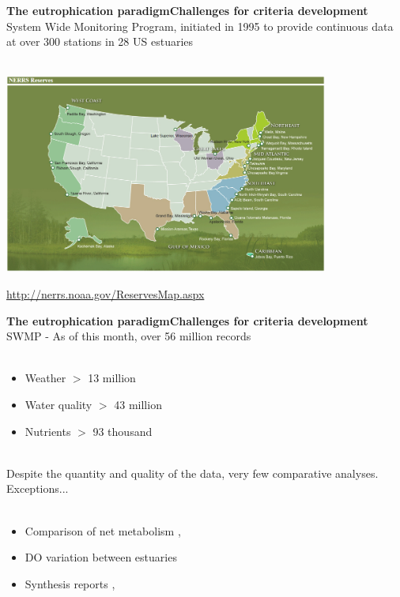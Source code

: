 \documentclass[serif]{beamer}\usepackage[]{graphicx}\usepackage[]{color}
\begin{document}
\begin{frame}[shrink]{\textbf{The eutrophication paradigm}}{\textbf{Challenges for criteria development}}
System Wide Monitoring Program, initiated in 1995 to provide continuous data at over 300 stations in 28 US estuaries \\~\\
\centerline{\includegraphics[width = 0.8\textwidth]{fig/NERRS_locations.png}}
\tiny
\flushright
\href{http://nerrs.noaa.gov/ReservesMap.aspx}{http://nerrs.noaa.gov/ReservesMap.aspx}
\end{frame}

\begin{frame}{\textbf{The eutrophication paradigm}}{\textbf{Challenges for criteria development}}
\onslide<+->
SWMP - As of this month, over 56 million records\\~\\
\begin{itemize}
\item Weather $>$ 13 million
\item Water quality $>$ 43 million
\item Nutrients $>$ 93 thousand \\~\\
\end{itemize}
\onslide<+->
Despite the quantity and quality of the data, very few comparative analyses. Exceptions... \\~\\
\begin{itemize}
\item Comparison of net metabolism \cite{Caffrey03}, \cite{Caffrey04}
\item DO variation between estuaries \cite{Wenner04}
\item Synthesis reports \cite{Wenner01}, \cite{Sanger02}
\end{itemize}
\end{frame}
\end{document}
